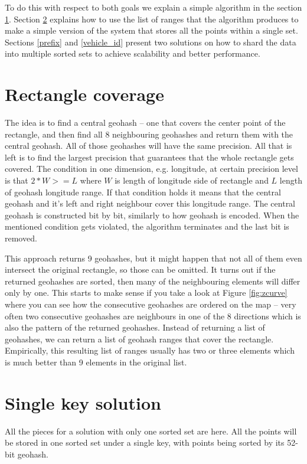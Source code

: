 \documentclass[times, utf8, diplomski]{fer}
\begin{document}
To do this with respect to both goals we explain a simple algorithm in the section \ref{rect_cov}.
Section \ref{single_key} explains how to use the list of ranges that the algorithm produces to make a simple version of the system that stores all the points within a single set. Sections \ref{prefix} and \ref{vehicle_id} present two solutions on how to shard the data into multiple sorted sets to achieve scalability and better performance.

\section {Rectangle coverage} \label {rect_cov}
The idea is to find a central geohash -- one that covers the center point of the rectangle, and then find all 8 neighbouring geohashes and return them with the central geohash. All of those geohashes will have the same precision. All that is left is to find the largest precision that guarantees that the whole rectangle gets covered. The condition in one dimension, e.g. longitude, at certain precision level is that $2*W >= L$ where $W$ is length of longitude side of rectangle and $L$ length of geohash longitude range. If that condition holds it means that the central geohash and it's left and right neighbour cover this longitude range. The central geohash is constructed bit by bit, similarly to how geohash is encoded. When the mentioned condition gets violated, the algorithm terminates and the last bit is removed.

This approach returns 9 geohashes, but it might happen that not all of them even intersect the original rectangle, so those can be omitted. It turns out if the returned geohashes are sorted, then many of the neighbouring elements will differ only by one. This starts to make sense if you take a look at Figure \ref{fig:zcurve} where you can see how the consecutive geohashes are ordered on the map -- very often two consecutive geohashes are neighbours in one of the 8 directions which is also the pattern of the returned geohashes. Instead of returning a list of geohashes, we can return a list of geohash ranges that cover the rectangle. Empirically, this resulting list of ranges usually has two or three elements which is much better than 9 elements in the original list.

\section {Single key solution} \label {single_key}
All the pieces for a solution with only one sorted set are here. All the points will be stored in one sorted set under a single key, with points being sorted by its 52-bit geohash.
\end{document}
